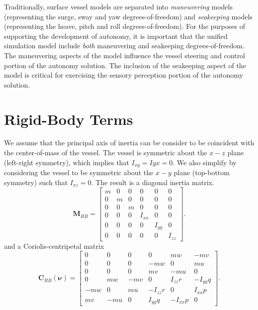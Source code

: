 \documentclass[11pt, letterpaper]{article}
\begin{document}
Traditionally, surface vessel models are separated into \emph{maneuvering} models (representing the surge, sway and yaw degrees-of-freedom) and \emph{seakeeping} models (representing the heave, pitch and roll degrees-of-freedom). For the purposes of supporting the development of autonomy, it is important that the unified simulation model include \emph{both} maneuvering and seakeeping degrees-of-freedom. The maneuvering aspects of the model influence the vessel steering and control portion of the autonomy solution. The inclusion of the seakeeping aspect of the model is critical for exercising the sensory perception portion of the autonomy solution.

\section{Rigid-Body Terms}

We assume that the principal axis of inertia can be consider to be coincident with the center-of-mass of the vessel.  The vessel is symmetric about the $x-z$ plane (left-right symmetry), which implies that $I_{xy}=I{yx}=0$.  We also simplify by considering the vessel to be symmetric about the $x-y$ plane (top-bottom symmetry) such that $I_{xz}=0$.  The result is a diagonal inertia matrix.
\begin{equation}
\bm{M}_{RB}= \left[ 
\begin{array}{ccccccc}
m & 0 & 0 & 0 & 0 & 0 \\
0 & m & 0 & 0 & 0 & 0 \\
0 & 0 & m & 0 & 0 & 0 \\
0 & 0 & 0 & I_{xx} & 0 & 0 \\
0 & 0 & 0 & 0 & I_{yy} & 0 \\
0 & 0 & 0 & 0 & 0 & I_{zz} 
\end{array} \right].
\end{equation}
and a Coriolis-centripetal matrix
\begin{equation}
\bm{C}_{RB}(\bm{\nu})= \left[ 
\begin{array}{ccccccc}
  0 & 0 & 0 & 0 & mw & -mv \\
  0 & 0 & 0 & -mw & 0 & mu \\
  0 & 0 & 0 & mv & -mu & 0 \\
  0 & mw  & -mv & 0 & I_{zz}r & -I_{yy}q \\
  -mw & 0 & mu & -I_{zz}r & 0 & I_{xx}p \\
  mv & -mu & 0 & I_{yy}q & -I_{xx}p  & 0
\end{array} \right].
\end{equation}
\end{document}
